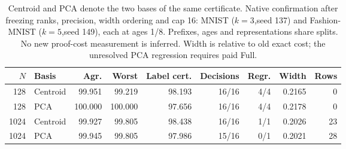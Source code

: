 \begin{table}[tbp]
\centering
\caption{Centroid and PCA denote the two bases of the same certificate. Native confirmation after freezing ranks, precision, width ordering and cap 16: MNIST ($k=3$,seed 137) and Fashion-MNIST ($k=5$,seed 149), each at ages 1/8. Prefixes, ages and representations share splits. No new proof-cost measurement is inferred. Width is relative to old exact cost; the unresolved PCA regression requires paid Full.}
\label{tab:confirmation-quality}
\begin{adjustbox}{max width=.98\textwidth,center=\textwidth}
\begin{tabular}{rlrrrrrrr}
\toprule
$N$ & Basis & Agr. & Worst & Label cert. & Decisions & Regr. & Width & Rows\\
\midrule
128 & Centroid & 99.951 & 99.219 & 98.193 & 16/16 & 4/4 & 0.2165 & 0\\
128 & PCA & 100.000 & 100.000 & 97.656 & 16/16 & 4/4 & 0.2178 & 0\\
1024 & Centroid & 99.927 & 99.805 & 98.438 & 16/16 & 1/1 & 0.2026 & 23\\
1024 & PCA & 99.945 & 99.805 & 97.986 & 15/16 & 0/1 & 0.2021 & 28\\
\bottomrule
\end{tabular}
\end{adjustbox}
\end{table}
